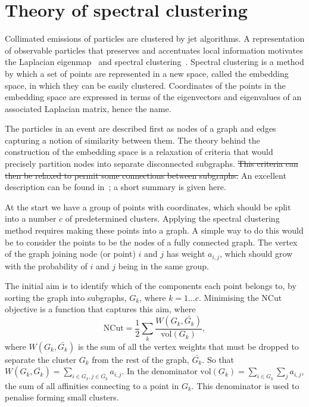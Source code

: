 \section{Theory of spectral clustering}\label{sec:spectral_theory}

{\color{magenta} Collimated emissions of particles are clustered by jet algorithms.  A
representation of observable particles that preserves and accentuates local information
motivates the Laplacian eigenmap~\cite{BelkinNiyogi2003} and spectral
clustering~\cite{NgJordanWeiss2002}.}  
Spectral clustering is a method by which a set of points are represented in a new space,
called the embedding space, in which they can be easily clustered.  Coordinates of the
points in the embedding space are expressed in terms of the eigenvectors and eigenvalues
of an associated Laplacian matrix, hence the name.

%
{\color{magenta} The particles in an event are described first as nodes of a graph and
edges capturing a notion of similarity between them.}  The theory behind the
construction of the embedding space is a relaxation of criteria that would precisely
partition nodes into separate disconnected subgraphs.
\sout{This criteria can then be relaxed to permit some connections between subgraphs.}
An excellent description can be found in~\cite{luxburg2007spectraltutorial}; a short
summary is given here.

At the start we have a group of points with coordinates, which should be split into a  number \(c\) of predetermined clusters.
Applying the spectral clustering method requires making these points into a graph.
A simple way to do this would be to consider the points to be the nodes of a fully connected graph.
The vertex of the graph joining node (or point) \(i\) and \(j\) has weight \(a_{i, j}\),
which should grow with the probability of \(i\) and \(j\) being in the same group.

The initial aim is to identify which of the components each point belongs to,
by sorting the graph into subgraphs, \(G_k\), where \(k=1 \dots c\).
Minimising the NCut objective is a function that captures this aim, where 
\begin{equation}
    \text{NCut} = \frac{1}{2}\sum_k\frac{W(G_k, \bar{G_k})}{\text{vol}(G_k)},
\end{equation}\label{eqn:cost_function}
where \(W(G_k, \bar{G_k})\) is the sum of all the vertex weights that must be dropped
to separate the cluster \(G_k\) from the rest of the graph, \(\bar{G_k}\).
So that \( W(G_k, \bar{G_k}) = \sum_{i \in G_k, j \in \bar{G_k}} a_{i, j} \).
In the denominator \(\text{vol}(G_k) = \sum_{i \in G_k} \sum_{j} a_{i, j}\),
the sum of all affinities connecting to a point in \(G_k\).
This denominator is used to penalise forming small clusters.

